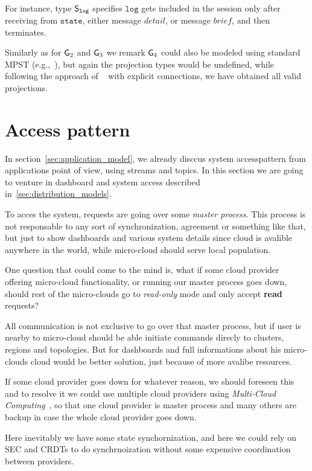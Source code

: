 For instance, type ${\mathsf S}_\mathtt{log}$ specifies $\mathtt{log}$ gets included in the session only after receiving from $\mathtt{state}$, either message $\mathit{detail}$, or message $\mathit{brief}$, and then terminates. 

Similarly as for ${\sf G}_2$ and ${\sf G}_3$ we remark ${\sf G}_4$ could also be modeled using standard MPST (e.g.,~\cite{HondaYC08}), but again the projection types would be undefined, while following the approach of ~\cite{HuY17} with explicit connections, we have obtained all valid projections.
%
%
\section{Access pattern}\label{sec:access_pattern}
%
In section~\ref{sec:application_model}, we already disccus system accesspattern from applications point of view, using streams and topics. In this section we are going to venture in dashboard and system access described in~\ref{sec:distribution_models}. 

To acces the system, requests are going over some \textit{master process}. This process is not responsable to any sort of synchronization, agreement or something like that, but just to show dashboards and various system details since cloud is avalible anywhere in the world, while micro-cloud should serve local population. 

One question that could come to the mind is, what if some cloud provider offering micro-cloud functionality, or running our master process goes down, should rest of the micro-clouds go to \textit{read-only} mode and only accept \textbf{read} requests?

All communication is not exclusive to go over that master process, but if user is nearby to micro-cloud should be able initiate commands direcly to clusters, regions and topologies. But for dashboards and full informations about his micro-clouds cloud would be better solution, just because of more avalibe resources.

If some cloud provider goes down for whatever reason, we should foreseen this and to resolve it we could use multiple cloud providers using \textit{Multi-Cloud Computing}~\cite{HongDSH19, Ardagna15}, so that one cloud provider is master process and many others are backup in case the whole cloud provider goes down.

Here inevitably we have some state synchornization, and here we could rely on SEC and CRDTs to do synchrnoization without some expensive coordination between providers.

